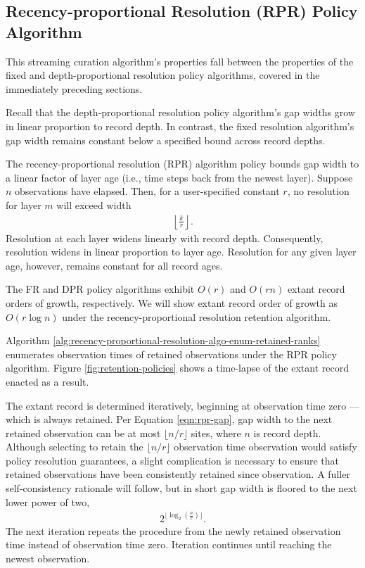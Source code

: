 \subsection{Recency-proportional Resolution (RPR) Policy Algorithm}
\label{sec:recency-proportional-resolution-algo}

This streaming curation algorithm's properties fall between the properties of the fixed and depth-proportional resolution policy algorithms, covered in the immediately preceding sections.

Recall that the depth-proportional resolution policy algorithm's gap widths grow in linear proportion to record depth.
In contrast, the fixed resolution algorithm's gap width remains constant below a specified bound across record depths.

The recency-proportional resolution (RPR) algorithm policy bounds gap width to a linear factor of layer age (i.e., time steps back from the newest layer).
Suppose $n$ observations have elapsed.
Then, for a user-specified constant $r$, no resolution for layer $m$ will exceed width
\begin{align}
  \left\lfloor \frac{k}{r} \right\rfloor.
  \label{eqn:rpr-gap}
\end{align}
Resolution at each layer widens linearly with record depth.
Consequently, resolution widens in linear proportion to layer age.
Resolution for any given layer age, however, remains constant for all record ages.

The FR and DPR policy algorithms exhibit $O(r)$ and $O(rn)$ extant record orders of growth, respectively.
We will show extant record order of growth as $O(r\log{n})$ under the recency-proportional resolution retention algorithm.

Algorithm \ref{alg:recency-proportional-resolution-algo-enum-retained-ranks} enumerates observation times of retained observations under the RPR policy algorithm.
Figure \ref{fig:retention-policies} shows a time-lapse of the extant record enacted as a result.

The extant record is determined iteratively, beginning at observation time zero --- which is always retained.
Per Equation \ref{eqn:rpr-gap}, gap width to the next retained observation can be at most $\lfloor n/r \rfloor$ sites, where $n$ is record depth.
Although selecting to retain the $\lfloor n/r \rfloor$ observation time observation would satisfy policy resolution guarantees, a slight complication is necessary to ensure that retained observations have been consistently retained since observation.
A fuller self-consistency rationale will follow, but in short gap width is floored to the next lower power of two,
\begin{align*}
  2^{\lfloor \log_{2}\left(\frac{n}{r}\right) \rfloor}.
\end{align*}
The next iteration repeats the procedure from the newly retained observation time instead of observation time zero.
Iteration continues until reaching the newest observation.

